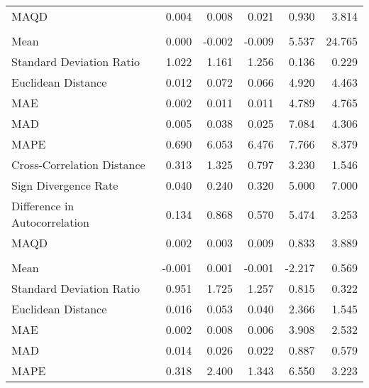 \begin{landscape}
\begin{ThreePartTable}
\begin{longtable}[t]{lrrrrr}
\hspace{1em}MAQD & 0.004 & 0.008 & 0.021 & 0.930 & 3.814\\
\addlinespace[0.5em]
\multicolumn{6}{l}{\textbf{ISR}}\\
\hline
\hspace{1em}Mean & 0.000 & -0.002 & -0.009 & 5.537 & 24.765\\
\hspace{1em}Standard Deviation Ratio & 1.022 & 1.161 & 1.256 & 0.136 & 0.229\\
\hspace{1em}Euclidean Distance & 0.012 & 0.072 & 0.066 & 4.920 & 4.463\\
\hspace{1em}MAE & 0.002 & 0.011 & 0.011 & 4.789 & 4.765\\
\hspace{1em}MAD & 0.005 & 0.038 & 0.025 & 7.084 & 4.306\\
\hspace{1em}MAPE & 0.690 & 6.053 & 6.476 & 7.766 & 8.379\\
\hspace{1em}Cross-Correlation Distance & 0.313 & 1.325 & 0.797 & 3.230 & 1.546\\
\hspace{1em}Sign Divergence Rate & 0.040 & 0.240 & 0.320 & 5.000 & 7.000\\
\hspace{1em}Difference in Autocorrelation & 0.134 & 0.868 & 0.570 & 5.474 & 3.253\\
\hspace{1em}MAQD & 0.002 & 0.003 & 0.009 & 0.833 & 3.889\\
\addlinespace[0.5em]
\multicolumn{6}{l}{\textbf{ITA}}\\
\hline
\hspace{1em}Mean & -0.001 & 0.001 & -0.001 & -2.217 & 0.569\\
\hspace{1em}Standard Deviation Ratio & 0.951 & 1.725 & 1.257 & 0.815 & 0.322\\
\hspace{1em}Euclidean Distance & 0.016 & 0.053 & 0.040 & 2.366 & 1.545\\
\hspace{1em}MAE & 0.002 & 0.008 & 0.006 & 3.908 & 2.532\\
\hspace{1em}MAD & 0.014 & 0.026 & 0.022 & 0.887 & 0.579\\
\hspace{1em}MAPE & 0.318 & 2.400 & 1.343 & 6.550 & 3.223\\

\end{longtable}
\end{ThreePartTable}
\end{landscape}
